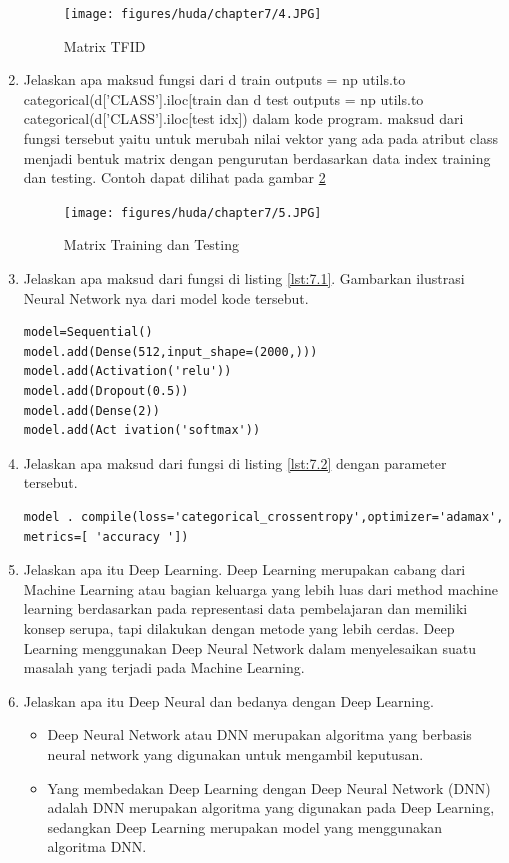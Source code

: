 \begin{enumerate}
\begin{figure}[!htbp]
	\centerline{\texttt{[image: figures/huda/chapter7/4.JPG]}}
	\caption{Matrix TFID}
	\label{c7_4}
\end{figure}
\item Jelaskan apa maksud fungsi dari d train outputs = np utils.to categorical(d['CLASS'].iloc[train dan d test outputs = np utils.to categorical(d['CLASS'].iloc[test idx]) dalam kode program.
\subitem maksud dari fungsi tersebut yaitu untuk merubah nilai vektor yang ada pada atribut class menjadi bentuk matrix dengan pengurutan berdasarkan data index training dan testing. Contoh dapat dilihat pada gambar \ref{c7_5}
\begin{figure}[!htbp]
	\centerline{\texttt{[image: figures/huda/chapter7/5.JPG]}}
	\caption{Matrix Training dan Testing}
	\label{c7_5}
\end{figure}
\item Jelaskan apa maksud dari fungsi di listing \ref{lst:7.1}. Gambarkan ilustrasi Neural Network nya dari model kode tersebut.
\begin{lstlisting}[caption=Neural Network,label={lst:7.1}]
model=Sequential()
model.add(Dense(512,input_shape=(2000,)))
model.add(Activation('relu'))
model.add(Dropout(0.5))
model.add(Dense(2))
model.add(Act ivation('softmax'))
\end{lstlisting}
\item Jelaskan apa maksud dari fungsi di listing \ref{lst:7.2} dengan parameter tersebut.
\begin{lstlisting}[caption=Model Compile Metric,label={lst:7.2}]
model . compile(loss='categorical_crossentropy',optimizer='adamax',
metrics=[ 'accuracy '])
\end{lstlisting}
\item Jelaskan apa itu Deep Learning.
\subitem Deep Learning merupakan cabang dari Machine Learning atau bagian keluarga yang lebih luas dari method machine learning berdasarkan pada representasi data pembelajaran dan memiliki konsep serupa, tapi dilakukan dengan metode yang lebih cerdas. Deep Learning menggunakan Deep Neural Network dalam menyelesaikan suatu masalah yang terjadi pada Machine Learning.
\item Jelaskan apa itu Deep Neural dan bedanya dengan Deep Learning.
\begin{itemize}
\item Deep Neural Network atau DNN merupakan algoritma yang berbasis neural network yang digunakan untuk mengambil keputusan.
\item Yang membedakan Deep Learning dengan  Deep Neural Network (DNN) adalah DNN merupakan algoritma yang digunakan pada Deep Learning, sedangkan Deep Learning merupakan model yang menggunakan algoritma DNN.

\end{itemize}
\end{enumerate}
